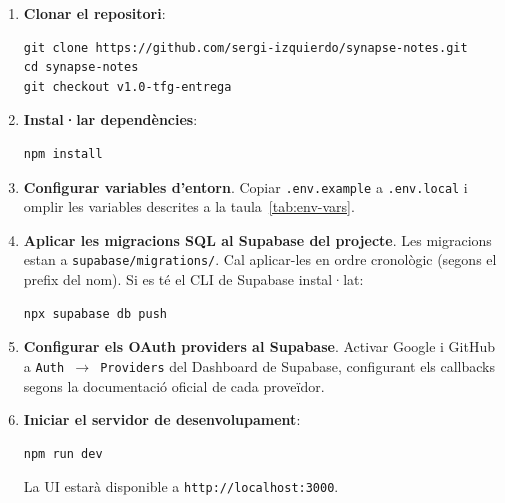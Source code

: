 \begin{enumerate}
    \item \textbf{Clonar el repositori}:
    \begin{verbatim}
git clone https://github.com/sergi-izquierdo/synapse-notes.git
cd synapse-notes
git checkout v1.0-tfg-entrega
    \end{verbatim}

    \item \textbf{Instal·lar dependències}:
    \begin{verbatim}
npm install
    \end{verbatim}

    \item \textbf{Configurar variables d'entorn}. Copiar \texttt{.env.example} a \texttt{.env.local} i omplir les variables descrites a la taula~\ref{tab:env-vars}.

    \item \textbf{Aplicar les migracions SQL al Supabase del projecte}. Les migracions estan a \texttt{supabase/migrations/}. Cal aplicar-les en ordre cronològic (segons el prefix del nom). Si es té el CLI de Supabase instal·lat:
    \begin{verbatim}
npx supabase db push
    \end{verbatim}

    \item \textbf{Configurar els OAuth providers al Supabase}. Activar Google i GitHub a \texttt{Auth $\rightarrow$ Providers} del Dashboard de Supabase, configurant els callbacks segons la documentació oficial de cada proveïdor.

    \item \textbf{Iniciar el servidor de desenvolupament}:
    \begin{verbatim}
npm run dev
    \end{verbatim}

    La UI estarà disponible a \texttt{http://localhost:3000}.
\end{enumerate}

